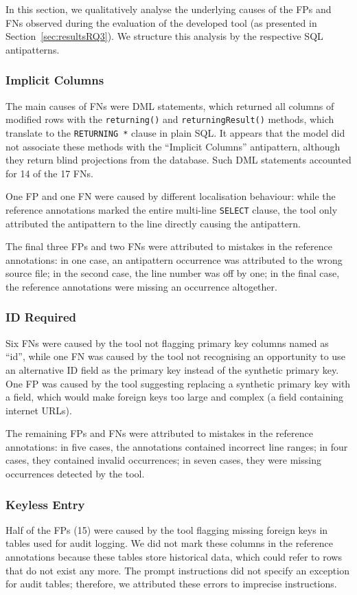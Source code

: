 In this section, we qualitatively analyse the underlying causes of the FPs and FNs observed during the evaluation of the developed tool (as presented in Section~\ref{sec:resultsRQ3}). We structure this analysis by the respective SQL antipatterns.

\subsubsection*{Implicit Columns}
The main causes of FNs were DML statements, which returned all columns of modified rows with the \texttt{returning()} and \texttt{returningResult()} methods, which translate to the \texttt{RETURNING *} clause in plain SQL. It appears that the model did not associate these methods with the “Implicit Columns” antipattern, although they return blind projections from the database. Such DML statements accounted for \num{14} of the \num{17} FNs.

One FP and one FN were caused by different localisation behaviour: while the reference annotations marked the entire multi-line \texttt{SELECT} clause, the tool only attributed the antipattern to the line directly causing the antipattern.

The final three FPs and two FNs were attributed to mistakes in the reference annotations: in one case, an antipattern occurrence was attributed to the wrong source file; in the second case, the line number was off by one; in the final case, the reference annotations were missing an occurrence altogether.

\subsubsection*{ID Required}
Six FNs were caused by the tool not flagging primary key columns named as “id”, while one FN was caused by the tool not recognising an opportunity to use an alternative ID field as the primary key instead of the synthetic primary key. One FP was caused by the tool suggesting replacing a synthetic primary key with a field, which would make foreign keys too large and complex (a field containing internet URLs).

The remaining FPs and FNs were attributed to mistakes in the reference annotations: in five cases, the annotations contained incorrect line ranges; in four cases, they contained invalid occurrences; in seven cases, they were missing occurrences detected by the tool.

\subsubsection*{Keyless Entry}
Half of the FPs (15) were caused by the tool flagging missing foreign keys in tables used for audit logging. We did not mark these columns in the reference annotations because these tables store historical data, which could refer to rows that do not exist any more. The prompt instructions did not specify an exception for audit tables; therefore, we attributed these errors to imprecise instructions.

